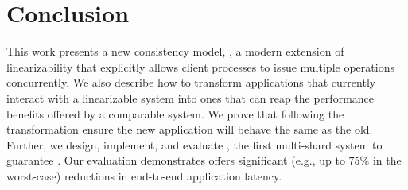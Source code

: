 \section{Conclusion}
\label{sec:concl}

This work presents a new consistency model, \mdllong{}, a
modern extension of linearizability that explicitly allows
client processes to issue multiple operations concurrently. We also describe how
to transform applications that currently interact with 
a linearizable system into ones that can reap the performance
benefits offered by a comparable \mdl{} system.
We prove that
following the transformation ensure the new application will 
behave the same as the old. Further, we design, implement,
and evaluate \sys{}, the first
multi-shard system to guarantee \mdl{}. Our evaluation 
demonstrates \sys{} offers significant (e.g., up to 75\% in the worst-case) 
reductions in end-to-end application latency.
